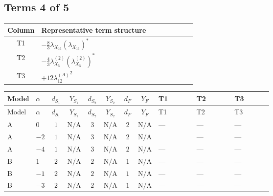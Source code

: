 \documentclass[8pt]{article}
\begin{document}
\begin{landscape}
\subsection*{Terms 4 of 5}
\begin{center}
\begin{tabular}{@{}c >{\raggedright\arraybackslash}p{0.82\linewidth}@{}}
\toprule
Column & Representative term structure \\
\midrule
T1 & \(\displaystyle -\frac{8}{3} {\lambda_{X_{16}}} \left({\lambda_{X_{16}}}\right)^{*}\) \\
\midrule
T2 & \(\displaystyle -\frac{4}{3} {\lambda_{X_{5}}^{(2)}} \left({\lambda_{X_{5}}^{(2)}}\right)^{*}\) \\
\midrule
T3 & \(\displaystyle +12 {\lambda_{12}^{(A)}}^2\) \\
\midrule
\bottomrule
\end{tabular}
\end{center}
\smallskip
\tiny
\begin{longtable}{@{}llcccccc >{\raggedright\arraybackslash}p{0.21\linewidth} >{\raggedright\arraybackslash}p{0.21\linewidth} >{\raggedright\arraybackslash}p{0.21\linewidth}@{}}
\toprule
Model & $\alpha$ & $d_{S_1}$ & $Y_{S_1}$ & $d_{S_2}$ & $Y_{S_2}$ & $d_F$ & $Y_F$ & T1 & T2 & T3 \\
\midrule
\endfirsthead
\toprule
Model & $\alpha$ & $d_{S_1}$ & $Y_{S_1}$ & $d_{S_2}$ & $Y_{S_2}$ & $d_F$ & $Y_F$ & T1 & T2 & T3 \\
\midrule
\endhead
A & $0$ & $1$ & $\text{N/A}$ & $3$ & $\text{N/A}$ & $2$ & $\text{N/A}$ & --- & --- & --- \\
\midrule
A & $-2$ & $1$ & $\text{N/A}$ & $3$ & $\text{N/A}$ & $2$ & $\text{N/A}$ & \scriptsize\adjustbox{max width=\linewidth}{$\begin{gathered} -\frac{8}{3} {\lambda_{X_{16}}} \left({\lambda_{X_{16}}}\right)^{*}\end{gathered}$} & --- & --- \\
\midrule
A & $-4$ & $1$ & $\text{N/A}$ & $3$ & $\text{N/A}$ & $2$ & $\text{N/A}$ & --- & --- & --- \\
\midrule
B & $1$ & $2$ & $\text{N/A}$ & $2$ & $\text{N/A}$ & $1$ & $\text{N/A}$ & --- & --- & --- \\
\midrule
B & $-1$ & $2$ & $\text{N/A}$ & $2$ & $\text{N/A}$ & $1$ & $\text{N/A}$ & --- & --- & --- \\
\midrule
B & $-3$ & $2$ & $\text{N/A}$ & $2$ & $\text{N/A}$ & $1$ & $\text{N/A}$ & --- & --- & --- \\

\end{longtable}
\end{landscape}
\end{document}
